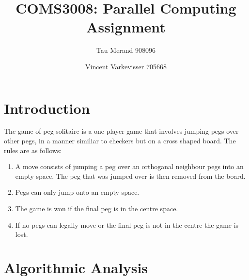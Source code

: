 \documentclass[12pt,a4paper]{report}
\begin{document}
\parindent0pt

\title{COMS3008: Parallel Computing Assignment}
\author{Tau Merand 908096 \and Vincent Varkevisser 705668}
\maketitle
\section*{Introduction}
The game of peg solitaire is a one player game that involves jumping pegs over other pegs, in a manner similiar to checkers but on a cross shaped board. The rules are as follows:
\begin{enumerate}
  \item A move consists of jumping a peg over an orthoganal neighbour pegs into an empty space. The peg that was jumped over is then removed from the board.
  \item Pegs can only jump onto an empty space.
  \item The game is won if the final peg is in the centre space.
  \item If no pegs can legally move or the final peg is not in the centre the game is lost.
\end{enumerate}
\section*{Algorithmic Analysis}
\end{document}
